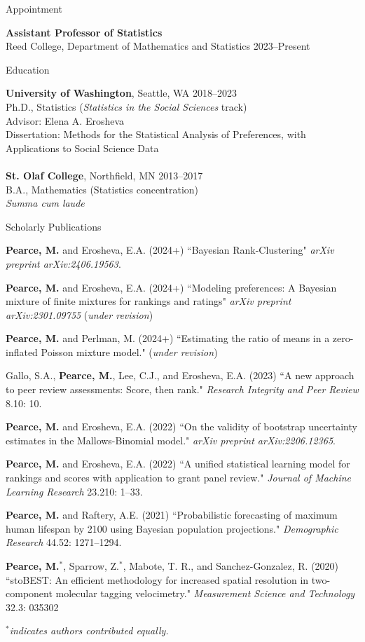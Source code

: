 \documentclass{resume} %
\begin{document}
\begin{rSection}{Appointment}

\textbf{Assistant Professor of Statistics}
\\ Reed College, Department of Mathematics and Statistics \hfill{2023--Present}
\end{rSection}

\begin{rSection}{Education}

\textbf{University of Washington}, Seattle, WA \hfill {2018--2023} 
\\ Ph.D., Statistics ({\it Statistics in the Social Sciences} track)
\\ Advisor: Elena A. Erosheva
\\ Dissertation: Methods for the Statistical Analysis of Preferences, with Applications to Social Science Data
\\
\\\textbf{St. Olaf College}, Northfield, MN \hfill {2013--2017} 
\\ B.A., Mathematics (Statistics concentration)
\\ {\it Summa cum laude}
\end{rSection}


\begin{rSection}{Scholarly Publications}

\textbf{Pearce, M.} and Erosheva, E.A. (2024+) ``Bayesian Rank-Clustering" \textit{arXiv preprint arXiv:2406.19563}.

\textbf{Pearce, M.} and Erosheva, E.A. (2024+) ``Modeling preferences: A Bayesian mixture of finite mixtures for rankings and ratings" \textit{arXiv preprint arXiv:2301.09755} (\textit{under revision})

\textbf{Pearce, M.} and Perlman, M. (2024+) ``Estimating the ratio of means in a zero-inflated Poisson mixture model." (\textit{under revision})

Gallo, S.A., \textbf{Pearce, M.}, Lee, C.J., and Erosheva, E.A. (2023) ``A new approach to peer review assessments: Score, then rank." \textit{Research Integrity and Peer Review} 8.10: 10.

\textbf{Pearce, M.} and Erosheva, E.A. (2022) ``On the validity of bootstrap uncertainty estimates in the Mallows-Binomial model." \textit{arXiv preprint arXiv:2206.12365}.

\textbf{Pearce, M.} and Erosheva, E.A. (2022) ``A unified statistical learning model for rankings and scores with application to grant panel review." \textit{Journal of Machine Learning Research} 23.210: 1--33.

\textbf{Pearce, M.} and Raftery, A.E. (2021) ``Probabilistic forecasting of maximum human lifespan by 2100 using Bayesian population projections." {\em Demographic Research} 44.52: 1271--1294.

\textbf{Pearce, M.}$^*$, Sparrow, Z.$^*$, Mabote, T. R., and Sanchez-Gonzalez, R. (2020) ``stoBEST: An efficient methodology for increased spatial resolution in two-component molecular tagging velocimetry." {\em Measurement Science and Technology} 32.3: 035302

{\em $^*$indicates authors contributed equally.}
\end{rSection}
\end{document}
